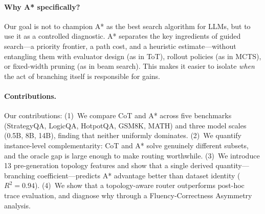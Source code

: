 \documentclass{article}
\begin{document}




\paragraph{Why A* specifically?}
Our goal is not to champion A* as the best search algorithm for LLMs, but to use it as a controlled diagnostic. A* separates the key ingredients of guided search---a priority frontier, a path cost, and a heuristic estimate---without entangling them with evaluator design (as in ToT), rollout policies (as in MCTS), or fixed-width pruning (as in beam search). This makes it easier to isolate \emph{when} the act of branching itself is responsible for gains.

\paragraph{Contributions.}
Our contributions: (1)~We compare CoT and A* across five benchmarks (StrategyQA, LogicQA, HotpotQA, GSM8K, MATH) and three model scales (0.5B, 8B, 14B), finding that neither uniformly dominates. (2)~We quantify instance-level complementarity: CoT and A* solve genuinely different subsets, and the oracle gap is large enough to make routing worthwhile. (3)~We introduce 13 pre-generation topology features and show that a single derived quantity---branching coefficient---predicts A* advantage better than dataset identity ($R^2=0.94$). (4)~We show that a topology-aware router outperforms post-hoc trace evaluation, and diagnose why through a Fluency-Correctness Asymmetry analysis.



\end{document}
